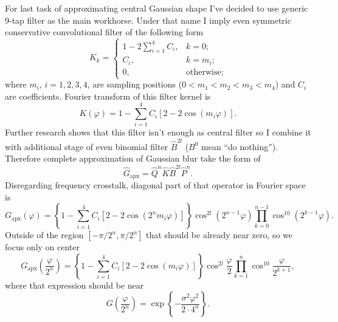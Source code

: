\documentclass[10pt]{article}
\begin{document}
For last task of approximating central Gaussian shape I've decided to use generic 9-tap filter as
the main workhorse. Under that name I imply even symmetric conservative convolutional filter of the
following form
\begin{equation}\label{main}
    K_k = \left\{
        \begin{array}{ll}
            1 - 2\sum_{i=1}^4 C_i,& k = 0;\\
            C_i,& k = m_i;\\
            0,& \text{otherwise};
        \end{array}
    \right.
\end{equation}
where $m_i$, $i=1, 2, 3, 4$, are sampling positions ($0 < m_1 < m_2 < m_3 < m_4$) and $C_i$ are
coefficients. Fourier transform of this filter kernel is
\begin{equation}
    K(\varphi) = 1 - \sum_{i=1}^4 C_i[2 - 2\cos(m_i\varphi)].
\end{equation}
Further research shows that this filter isn't enough as central filter so I combine it with
additional stage of even binomial filter $\hat B^{2l}$ ($B^0$ mean ``do nothing''). Therefore
complete approximation of Gaussian blur take the form of
\begin{equation}
    \hat G_{\text{apx}} = \hat Q^n\hat K\hat B^{2l}\hat P^n.
\end{equation}
Disregarding frequency crosstalk, diagonal part of that operator in Fourier space is
\begin{equation}
    G_{\text{apx}}(\varphi) = \left\{1 - \sum_{i=1}^4 C_i[2 - 2\cos(2^nm_i\varphi)]\right\}
        \cos^{2l}(2^{n-1}\varphi) \prod_{k=0}^{n-1} \cos^{10}(2^{k-1}\varphi).
\end{equation}
Outside of the region $[-\pi/2^n, \pi/2^n]$ that should be already near zero, so we focus only on
center
\begin{equation}
    G_{\text{apx}}\left(\frac\varphi{2^n}\right) =
        \left\{1 - \sum_{i=1}^4 C_i[2 - 2\cos(m_i\varphi)]\right\}
        \cos^{2l}\frac\varphi2 \prod_{k=1}^n \cos^{10}\frac\varphi{2^{k+1}},
\end{equation}
where that expression should be near
\begin{equation}
    G\left(\frac\varphi{2^n}\right) = \exp\left\{-\frac{\sigma^2\varphi^2}{2\cdot4^n}\right\}.
\end{equation}
\end{document}
